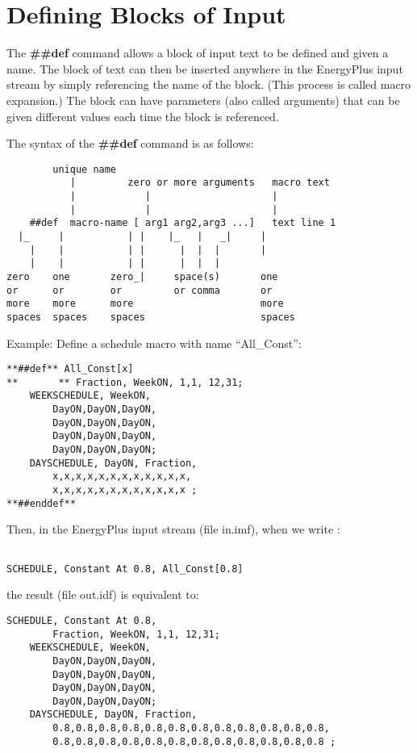 \section{Defining Blocks of Input}\label{defining-blocks-of-input}

The \textbf{\#\#def} command allows a block of input text to be defined and given a name. The block of text can then be inserted anywhere in the EnergyPlus input stream by simply referencing the name of the block. (This process is called macro expansion.) The block can have parameters (also called arguments) that can be given different values each time the block is referenced.

The syntax of the \textbf{\#\#def} command is as follows:

\begin{lstlisting}
        unique name
           |         zero or more arguments   macro text
           |            |                     |
           |            |                     |
    ##def  macro-name [ arg1 arg2,arg3 ...]   text line 1
  |_     |           | |    |_   |   _|     |
    |    |           | |      |  |  |       |
    |    |           | |      |  |  |       
zero    one       zero_|     space(s)       one
or      or        or         or comma       or
more    more      more                      more
spaces  spaces    spaces                    spaces
\end{lstlisting}

Example: Define a schedule macro with name ``All\_Const'':

\begin{lstlisting}
**##def** All_Const[x]
**       ** Fraction, WeekON, 1,1, 12,31;
    WEEKSCHEDULE, WeekON,
        DayON,DayON,DayON,
        DayON,DayON,DayON,
        DayON,DayON,DayON,
        DayON,DayON,DayON;
    DAYSCHEDULE, DayON, Fraction,
        x,x,x,x,x,x,x,x,x,x,x,x,
        x,x,x,x,x,x,x,x,x,x,x,x ;
**##enddef**
\end{lstlisting}

Then, in the EnergyPlus input stream (file in.imf), when we write :

\begin{lstlisting}

SCHEDULE, Constant At 0.8, All_Const[0.8]
\end{lstlisting}

the result (file out.idf) is equivalent to:

\begin{lstlisting}
SCHEDULE, Constant At 0.8,
        Fraction, WeekON, 1,1, 12,31;
    WEEKSCHEDULE, WeekON,
        DayON,DayON,DayON,
        DayON,DayON,DayON,
        DayON,DayON,DayON,
        DayON,DayON,DayON;
    DAYSCHEDULE, DayON, Fraction,
        0.8,0.8,0.8,0.8,0.8,0.8,0.8,0.8,0.8,0.8,0.8,0.8,
        0.8,0.8,0.8,0.8,0.8,0.8,0.8,0.8,0.8,0.8,0.8,0.8 ;
\end{lstlisting}

